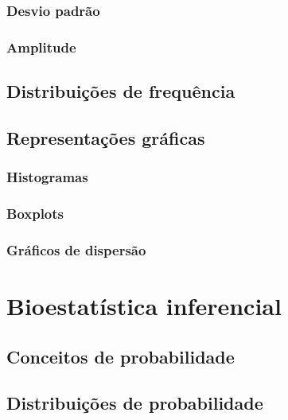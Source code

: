 \documentclass[
]{book}
\begin{document}
\subsection{Desvio padrão}\label{desvio-padruxe3o}

\subsection{Amplitude}\label{amplitude}

\section{Distribuições de frequência}\label{distribuiuxe7uxf5es-de-frequuxeancia}

\section{Representações gráficas}\label{representauxe7uxf5es-gruxe1ficas}

\subsection{Histogramas}\label{histogramas}

\subsection{Boxplots}\label{boxplots}

\subsection{Gráficos de dispersão}\label{gruxe1ficos-de-dispersuxe3o}

\chapter{Bioestatística inferencial}\label{bioestatuxedstica-inferencial}

\section{Conceitos de probabilidade}\label{conceitos-de-probabilidade}

\section{Distribuições de probabilidade}\label{distribuiuxe7uxf5es-de-probabilidade}
\end{document}
